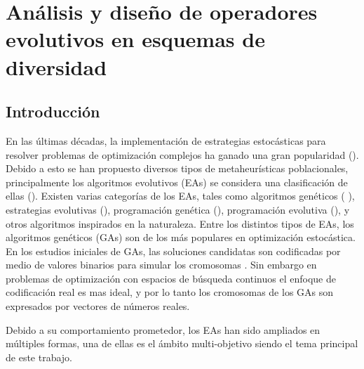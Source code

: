 \chapter{Análisis y diseño de operadores evolutivos en esquemas de diversidad} %

\label{Chapter5}

\section{Introducción}
En las últimas décadas, la implementación de estrategias estocásticas para resolver problemas de optimización complejos ha ganado una gran popularidad (\cite{talbi2009metaheuristics}).
%
%
Debido a esto se han propuesto diversos tipos de metaheurísticas poblacionales, principalmente los algoritmos evolutivos (EAs) se considera una clasificación de ellas (\cite{de2006evolutionary}).
%
Existen varias categorías de los EAs, tales como algoritmos genéticos ( \cite{goldberg1989genetic}), estrategias evolutivas (\cite{beyer2002evolution}), programación genética (\cite{koza1992genetic}), programación evolutiva (\cite{dong2007evolutionary}), y otros algoritmos inspirados en la naturaleza.
%
Entre los distintos tipos de EAs, los algoritmos genéticos (GAs) son de los más populares en optimización estocástica.
%
En los estudios iniciales de GAs, las soluciones candidatas son codificadas por medio de valores binarios para simular los cromosomas \cite{molinahttp}.
%
Sin embargo en problemas de optimización con espacios de búsqueda continuos el enfoque de codificación real es mas ideal, y por lo tanto los cromosomas de los GAs son expresados por vectores de números reales.
%

Debido a su comportamiento prometedor, los EAs han sido ampliados en múltiples formas, una de ellas es el ámbito multi-objetivo siendo el tema principal de este trabajo.
%

